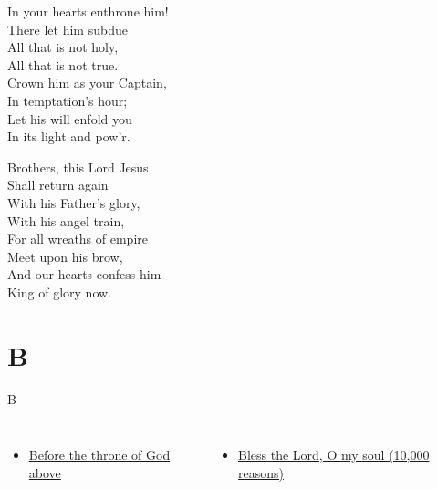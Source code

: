 \documentclass{beamer}
\begin{document}
{\hypertarget{At the name of Jesus[]3}{}
\begin{frame}{}
\fontsize{ 18 }{ 23 }\selectfont

In your hearts enthrone him!\\ 
There let him subdue\\ 
All that is not holy,\\ 
All that is not true.\\ 
Crown him as your Captain,\\ 
In temptation's hour;\\ 
Let his will enfold you\\ 
In its light and pow'r. 

\end{frame}

\hypertarget{At the name of Jesus[]4}{}
\begin{frame}{}
\fontsize{ 18 }{ 23 }\selectfont

Brothers, this Lord Jesus\\ 
Shall return again\\ 
With his Father's glory,\\ 
With his angel train,\\ 
For all wreaths of empire\\ 
Meet upon his brow,\\ 
And our hearts confess him\\ 
King of glory now. 

\end{frame}

}
\section{B}

\begin{frame}{B}
\begin{columns}
    \begin{itemize}
    \item \hyperlink{Before the throne of God above[]1}{Before the throne of God above }
\end{itemize}
    \begin{itemize}
    \item \hyperlink{10,000 reasons['Bless the Lord, O my soul']C}{Bless the Lord, O my soul (10,000 reasons)}
\end{itemize}


\end{columns}

\end{frame}
\end{document}

